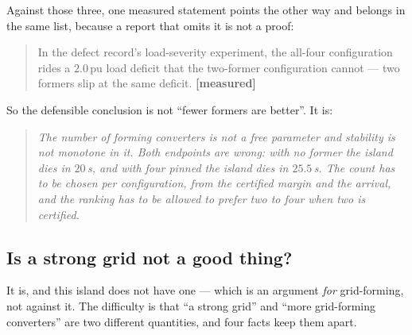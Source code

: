 \documentclass[12pt,a4paper]{article}
\theoremstyle{remark}
\newcommand{\pu}{\,\mathrm{pu}}
\newcommand{\measured}{\textcolor{ok}{\textbf{[measured]}}}
\begin{document}
Against those three, one measured statement points the other way and belongs in
the same list, because a report that omits it is not a proof:

\begin{quote}
In the defect record's load-severity experiment, the all-four configuration rides
a $2.0\pu$ load deficit that the two-former configuration cannot --- two formers
slip at the same deficit. \measured
\end{quote}

So the defensible conclusion is not ``fewer formers are better''. It is:

\begin{quote}\small\itshape
The number of forming converters is not a free parameter and stability is not
monotone in it. Both endpoints are wrong: with no former the island dies in
$20$\,s, and with four pinned the island dies in $25.5$\,s. The count has to be
chosen per configuration, from the certified margin and the arrival, and the
ranking has to be allowed to prefer two to four when two is certified.
\end{quote}

\subsection{Is a strong grid not a good thing?}\label{sec:stronggrid}

It is, and this island does not have one --- which is an argument \emph{for}
grid-forming, not against it. The difficulty is that ``a strong grid'' and ``more
grid-forming converters'' are two different quantities, and four facts keep them
apart.
\end{document}
